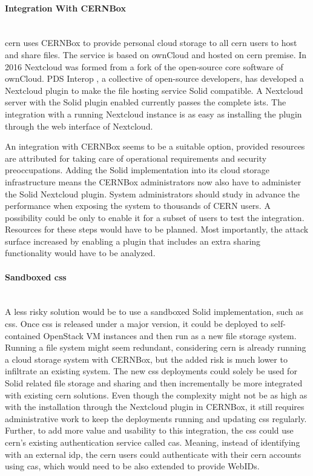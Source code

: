 \paragraph{Integration With CERNBox}\mbox{}\\

\gls{cern} uses CERNBox \cite{cernbox} to provide personal cloud storage to all \gls{cern} users to host and share files. The service is based on ownCloud \cite{owncloud} and hosted on \gls{cern} premise. In 2016 Nextcloud \cite{nextcloud} was formed from a fork of the open-source core software of ownCloud. PDS Interop \cite{pds-interop}, a collective of open-source developers, has developed a Nextcloud \cite{nextcloud} plugin to make the file hosting service Solid compatible. A Nextcloud server with the Solid plugin enabled currently passes the complete \gls{ists}. The integration with a running Nextcloud instance is as easy as installing the plugin through the web interface of Nextcloud.

An integration with CERNBox seems to be a suitable option, provided resources are attributed for taking care of operational requirements and security preoccupations. Adding the Solid implementation into its cloud storage infrastructure means the CERNBox administrators now also have to administer the Solid Nextcloud plugin. System administrators should study in advance the performance when exposing the system to thousands of CERN users. A possibility could be only to enable it for a subset of users to test the integration. Resources for these steps would have to be planned. Most importantly, the attack surface increased by enabling a plugin that includes an extra sharing functionality would have to be analyzed.
\vspace{0.5cm}
\paragraph{Sandboxed \gls{css}}\mbox{}\\

A less risky solution would be to use a sandboxed Solid implementation, such as \gls{css}. Once \gls{css} is released under a major version, it could be deployed to self-contained OpenStack VM instances and then run as a new file storage system. Running a file system might seem redundant, considering \gls{cern} is already running a cloud storage system with CERNBox, but the added risk is much lower to infiltrate an existing system. The new \gls{css} deployments could solely be used for Solid related file storage and sharing and then incrementally be more integrated with existing \gls{cern} solutions. Even though the complexity might not be as high as with the installation through the Nextcloud plugin in CERNBox, it still requires administrative work to keep the deployments running and updating \gls{css} regularly. Further, to add more value and usability to this integration, the \gls{css} could use \gls{cern}'s existing authentication service called \gls{cas}. Meaning, instead of identifying with an external \gls{idp}, the \gls{cern} users could authenticate with their \gls{cern} accounts using \gls{cas}, which would need to be also extended to provide WebIDs.

